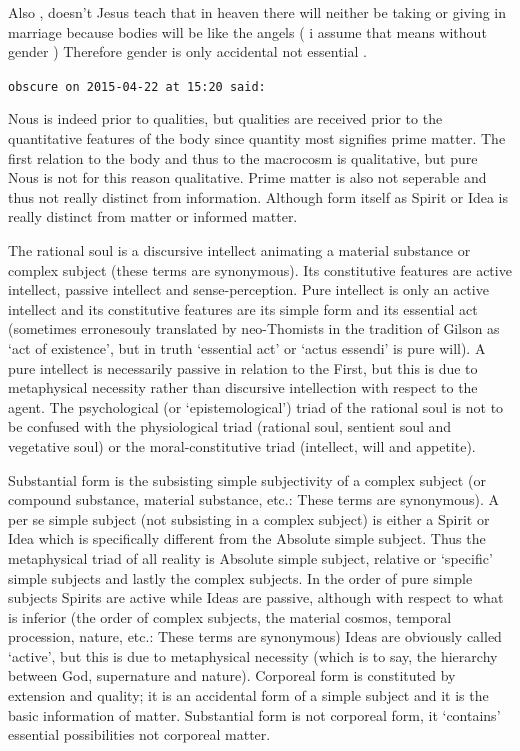 \begin{footnotesize}
\begin{sffamily}
Also , doesn't Jesus teach that in heaven there will neither be taking or giving in marriage because bodies will be like the angels ( i assume that means without gender ) Therefore gender is only accidental not essential .

\hfill

\texttt{obscure on 2015-04-22 at 15:20 said:}

Nous is indeed prior to qualities, but qualities are received prior to the quantitative features of the body since quantity most signifies prime matter. The first relation to the body and thus to the macrocosm is qualitative, but pure Nous is not for this reason qualitative. Prime matter is also not seperable and thus not really distinct from information. Although form itself as Spirit or Idea is really distinct from matter or informed matter.

The rational soul is a discursive intellect animating a material substance or complex subject (these terms are synonymous). Its constitutive features are active intellect, passive intellect and sense-perception. Pure intellect is only an active intellect and its constitutive features are its simple form and its essential act (sometimes erronesouly translated by neo-Thomists in the tradition of Gilson as `act of existence', but in truth `essential act' or `actus essendi' is pure will). A pure intellect is necessarily passive in relation to the First, but this is due to metaphysical necessity rather than discursive intellection with respect to the agent. The psychological (or `epistemological') triad of the rational soul is not to be confused with the physiological triad (rational soul, sentient soul and vegetative soul) or the moral-constitutive triad (intellect, will and appetite).

Substantial form is the subsisting simple subjectivity of a complex subject (or compound substance, material substance, etc.: These terms are synonymous). A per se simple subject (not subsisting in a complex subject) is either a Spirit or Idea which is specifically different from the Absolute simple subject. Thus the metaphysical triad of all reality is Absolute simple subject, relative or `specific' simple subjects and lastly the complex subjects. In the order of pure simple subjects Spirits are active while Ideas are passive, although with respect to what is inferior (the order of complex subjects, the material cosmos, temporal procession, nature, etc.: These terms are synonymous) Ideas are obviously called `active', but this is due to metaphysical necessity (which is to say, the hierarchy between God, supernature and nature). Corporeal form is constituted by extension and quality; it is an accidental form of a simple subject and it is the basic information of matter. Substantial form is not corporeal form, it `contains' essential possibilities not corporeal matter.


\end{sffamily}
\end{footnotesize}
